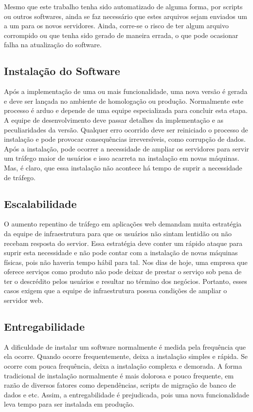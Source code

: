 \documentclass[
	12pt,				%
	openright,			%
	oneside,			%
	a4paper,			%
	chapter=TITLE,		%
	section=TITLE,		%
	english,			%
	french,				%
	spanish,			%
	brazil				%
	]{abntex2}
\begin{document}
Mesmo que este trabalho tenha sido automatizado de alguma forma, por scripts ou outros softwares, ainda se faz necessário que estes arquivos sejam enviados um a um para os novos servidores. Ainda, corre-se o risco de ter algum arquivo corrompido ou que tenha sido gerado de maneira errada, o que pode ocasionar falha na atualização do software.

\subsection{Instalação do Software}

Após a implementação de uma ou mais funcionalidade, uma nova versão é gerada e deve ser lançada no ambiente de homologação ou produção. Normalmente este processo é arduo e depende de uma equipe especializada para concluir esta etapa. A equipe de desenvolvimento deve passar detalhes da implementação e as peculiaridades da versão. Qualquer erro ocorrido deve ser reiniciado o processo de instalação e pode provocar consequências irreversíveis, como corrupção de dados. Após a instalação, pode ocorrer a necessidade de ampliar os servidores para servir um tráfego maior de usuários e isso acarreta na instalação em novas máquinas. Mas, é claro, que essa instalação não acontece há tempo de suprir a necessidade de tráfego.

\subsection{Escalabilidade}

O aumento repentino de tráfego em aplicações web demandam muita estratégia da equipe de infraestrutura para que os usuários não sintam lentidão ou não recebam resposta do servior. Essa estratégia deve conter um rápido ataque para suprir esta necessidade e não pode contar com a instalação de novas máquinas físicas, pois não haveria tempo hábil para tal. Nos dias de hoje, uma empresa que oferece serviços como produto não pode deixar de prestar o serviço sob pena de ter o descrédito pelos usuários e resultar no término dos negócios. Portanto, esses casos exigem que a equipe de infraestrutura possua condições de ampliar o servidor web.

\subsection{Entregabilidade}

A dificuldade de instalar um software normalmente é medida pela frequência que ela ocorre. Quando ocorre frequentemente, deixa a instalação simples e rápida. Se ocorre com pouca frequência, deixa a instalação complexa e demorada. A forma tradicional de instalação normalmente é mais dolorosa e pouco frequente, em razão de diversos fatores como dependências, scripts de migração de banco de dados e etc. Assim, a entregabilidade é prejudicada, pois uma nova funcionalidade leva tempo para ser instalada em produção.
\end{document}
